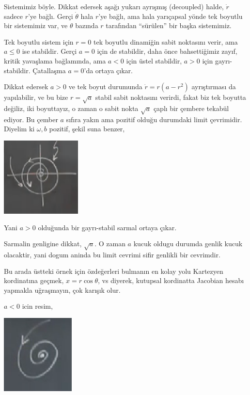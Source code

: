 \documentclass[12pt,fleqn]{article}\usepackage{../../common}
\begin{document}
Sistemimiz böyle. Dikkat edersek aşağı yukarı ayrışmış (decoupled) halde,
$\dot{r}$ sadece $r$'ye bağlı. Gerçi $\dot{\theta}$ hala $r$'ye bağlı, ama hala
yarıçapsal yönde tek boyutlu bir sistemimiz var, ve $\theta$ bazında $r$
tarafından ``sürülen'' bir başka sistemimiz.  

Tek boyutlu sistem için $r=0$ tek boyutlu dinamiğin sabit noktasını verir, ama
$a \le 0$ ise stabildir. Gerçi $a=0$ için de stabildir, daha önce bahsettiğimiz
zayıf, kritik yavaşlama bağlamında, ama $a<0$ için üstel stabildir, $a>0$ için
gayrı-stabildir. Çatallaşma $a=0$'da ortaya çıkar. 

Dikkat edersek $a>0$ ve tek boyut durumunda $\dot{r} = r(a-r^2)$ ayrıştırması da
yapılabilir, ve bu bize $r = \sqrt{a}$ stabil sabit noktasını verirdi, fakat biz
tek boyutta değiliz, iki boyuttayız, o zaman o sabit nokta $\sqrt{a}$ çaplı bir
çembere tekabül ediyor. Bu çember $a$ sıfıra yakın ama pozitif olduğu durumdaki
limit çevrimidir. Diyelim ki $\omega,b$ pozitif, şekil suna benzer, 

\includegraphics[height=4cm]{12_22.png}

Yani $a>0$ olduğunda bir gayrı-stabil sarmal ortaya çıkar.

Sarmalin genligine dikkat, $\sqrt{a}$. O zaman $a$ kucuk oldugu durumda genlik
kucuk olacaktir, yani dogum aninda bu limit cevrimi sifir genlikli bir
cevrimdir.

Bu arada üstteki örnek için özdeğerleri bulmanın en kolay yolu Kartezyen
kordinatına geçmek, $x=r\cos\theta$, vs diyerek, kutupsal kordinatta Jacobian
hesabı yapmakla uğraşmayın, çok karışık olur.

$a<0$ icin resim,

\includegraphics[height=4cm]{12_23.png}
\end{document}
